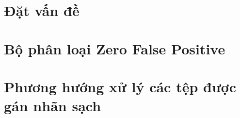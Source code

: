 \documentclass[./../main.tex]{subfiles}
\begin{document}
\section{Đặt vấn đề}
\section{Bộ phân loại Zero False Positive}
\section{Phương hướng xử lý các tệp được gán nhãn sạch}
\end{document}
